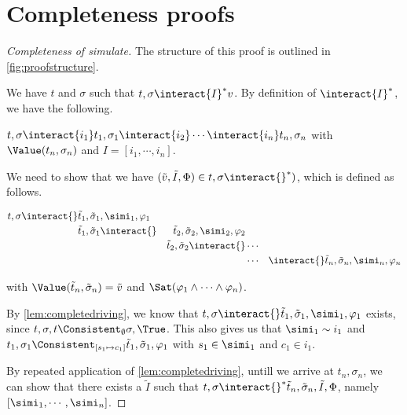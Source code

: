 
\section{Completeness proofs}
\label{sec:completenessproofs}

\begin{proof}[Completeness of simulate]
  The structure of this proof is outlined in \cref{fig:proofstructure}.

  We have $t$ and $\sigma$ such that $t,\sigma\interact{I}^*v$.
  By definition of $\interact{I}^*$, we have the following.

  $t,\sigma\interact{i_1}t_1,\sigma_1\interact{i_2}\cdots \interact{i_n}t_n,\sigma_n$ with $\Value(t_n,\sigma_n)$ and $I=[i_1,\cdots,i_n]$.

  We need to show that we have $(\tilde{v},\tilde{I},\Phi)\in t,\sigma\interact{}^*)$,
  which is defined as follows.

  \begin{align*}
      t,\sigma\interact{}&\tilde{t}_1,\tilde{\sigma}_1,\simi_1,\phi_1&\\
                      &\tilde{t}_1,\tilde{\sigma}_1\interact{}&\tilde{t}_2,\tilde{\sigma}_2,\simi_2,\phi_2\\
                      &                                    &\tilde{t}_2,\tilde{\sigma}_2\interact{}&\cdots&\\
                      &                                    &                                    &\cdots&
                      \interact{}\tilde{t}_n,\tilde{\sigma}_n,\simi_n,\phi_n
  \end{align*}

  with $\Value(\tilde{t}_n,\tilde{\sigma}_n)=\tilde{v}$ and $\Sat(\phi_1\land\cdots\land\phi_n)$.

  By \cref{lem:completedriving}, we know that $t,\sigma\interact{}\tilde{t}_1,\tilde{\sigma}_1,\simi_1,\phi_1$ exists,
  since $t,\sigma,t\Consistent_{\emptyset}\sigma,\True$.
  This also gives us that $\simi_1\sim i_1$ and $t_1,\sigma_1\Consistent_{[s_1\mapsto c_1]}\tilde{t}_1,\tilde{\sigma}_1,\phi_1$ with $s_1\in\simi_1$ and $c_1\in i_1$.

  By repeated application of \cref{lem:completedriving}, untill we arrive at $t_n,\sigma_n$,
  we can show that there exists a $\tilde{I}$ such that $t,\sigma\interact{}^*\tilde{t}_n,\tilde{\sigma}_n,\tilde{I},\Phi$,
  namely $[\simi_1,\cdots,\simi_n]$.

\end{proof}

